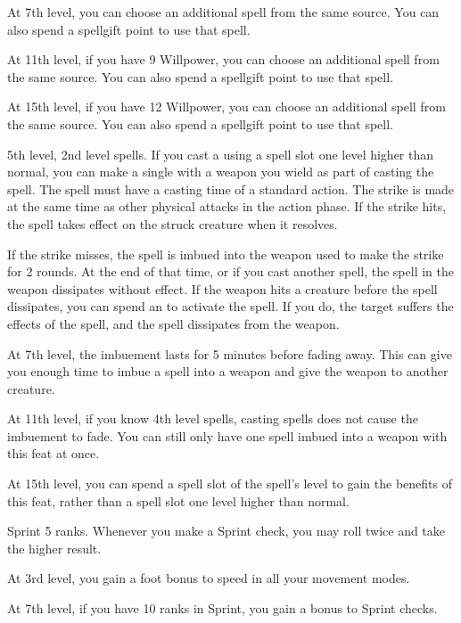     At 7th level, you can choose an additional spell from the same source. You can also spend a spellgift point to use that spell.

    At 11th level, if you have 9 Willpower, you can choose an additional spell from the same source. You can also spend a spellgift point to use that spell.

    At 15th level, if you have 12 Willpower, you can choose an additional spell from the same source. You can also spend a spellgift point to use that spell.

    \featpre 5th level, 2nd level spells.
    \featben If you cast a  using a spell slot one level higher than normal, you can make a single  with a weapon you wield as part of casting the spell.
    The spell must have a casting time of a standard action.
    The strike is made at the same time as other physical attacks in the action phase.
    If the strike hits, the spell takes effect on the struck creature when it resolves.

    If the strike misses, the spell is imbued into the weapon used to make the strike for 2 rounds.
    At the end of that time, or if you cast another spell, the spell in the weapon dissipates without effect.
    If the weapon hits a creature before the spell dissipates, you can spend an  to activate the spell.
    If you do, the target suffers the effects of the spell, and the spell dissipates from the weapon.

    At 7th level, the imbuement lasts for 5 minutes before fading away.
    This can give you enough time to imbue a spell into a weapon and give the weapon to another creature.

    At 11th level, if you know 4th level spells, casting spells does not cause the imbuement to fade.
    You can still only have one spell imbued into a weapon with this feat at once.

    At 15th level, you can spend a spell slot of the spell's level to gain the benefits of this feat, rather than a spell slot one level higher than normal.

    \featpre Sprint 5 ranks.
    \featben Whenever you make a Sprint check, you may roll twice and take the higher result.

    At 3rd level, you gain a  foot bonus to speed in all your movement modes.

    At 7th level, if you have 10 ranks in Sprint, you gain a  bonus to Sprint checks.

